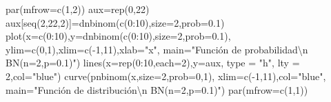 \documentclass[
  letterpaper,
  DIV=11,
  numbers=noendperiod]{scrreprt}
\newenvironment{Shaded}{\begin{snugshade}}{\end{snugshade}}
\newcommand{\AttributeTok}[1]{\textcolor[rgb]{0.40,0.45,0.13}{#1}}
\newcommand{\DecValTok}[1]{\textcolor[rgb]{0.68,0.00,0.00}{#1}}
\newcommand{\FloatTok}[1]{\textcolor[rgb]{0.68,0.00,0.00}{#1}}
\newcommand{\FunctionTok}[1]{\textcolor[rgb]{0.28,0.35,0.67}{#1}}
\newcommand{\NormalTok}[1]{\textcolor[rgb]{0.00,0.23,0.31}{#1}}
\newcommand{\OtherTok}[1]{\textcolor[rgb]{0.00,0.23,0.31}{#1}}
\newcommand{\SpecialCharTok}[1]{\textcolor[rgb]{0.37,0.37,0.37}{#1}}
\newcommand{\StringTok}[1]{\textcolor[rgb]{0.13,0.47,0.30}{#1}}
\begin{document}
\begin{Shaded}
\begin{Highlighting}[]
\FunctionTok{par}\NormalTok{(}\AttributeTok{mfrow=}\FunctionTok{c}\NormalTok{(}\DecValTok{1}\NormalTok{,}\DecValTok{2}\NormalTok{))}
\NormalTok{aux}\OtherTok{=}\FunctionTok{rep}\NormalTok{(}\DecValTok{0}\NormalTok{,}\DecValTok{22}\NormalTok{)}
\NormalTok{aux[}\FunctionTok{seq}\NormalTok{(}\DecValTok{2}\NormalTok{,}\DecValTok{22}\NormalTok{,}\DecValTok{2}\NormalTok{)]}\OtherTok{=}\FunctionTok{dnbinom}\NormalTok{(}\FunctionTok{c}\NormalTok{(}\DecValTok{0}\SpecialCharTok{:}\DecValTok{10}\NormalTok{),}\AttributeTok{size=}\DecValTok{2}\NormalTok{,}\AttributeTok{prob=}\FloatTok{0.1}\NormalTok{)}
\FunctionTok{plot}\NormalTok{(}\AttributeTok{x=}\FunctionTok{c}\NormalTok{(}\DecValTok{0}\SpecialCharTok{:}\DecValTok{10}\NormalTok{),}\AttributeTok{y=}\FunctionTok{dnbinom}\NormalTok{(}\FunctionTok{c}\NormalTok{(}\DecValTok{0}\SpecialCharTok{:}\DecValTok{10}\NormalTok{),}\AttributeTok{size=}\DecValTok{2}\NormalTok{,}\AttributeTok{prob=}\FloatTok{0.1}\NormalTok{),}
  \AttributeTok{ylim=}\FunctionTok{c}\NormalTok{(}\DecValTok{0}\NormalTok{,}\DecValTok{1}\NormalTok{),}\AttributeTok{xlim=}\FunctionTok{c}\NormalTok{(}\SpecialCharTok{{-}}\DecValTok{1}\NormalTok{,}\DecValTok{11}\NormalTok{),}\AttributeTok{xlab=}\StringTok{"x"}\NormalTok{,}
  \AttributeTok{main=}\StringTok{"Función de probabilidad}\SpecialCharTok{\textbackslash{}n}\StringTok{ BN(n=2,p=0.1)"}\NormalTok{)}
\FunctionTok{lines}\NormalTok{(}\AttributeTok{x=}\FunctionTok{rep}\NormalTok{(}\DecValTok{0}\SpecialCharTok{:}\DecValTok{10}\NormalTok{,}\AttributeTok{each=}\DecValTok{2}\NormalTok{),}\AttributeTok{y=}\NormalTok{aux, }\AttributeTok{type =} \StringTok{"h"}\NormalTok{, }\AttributeTok{lty =} \DecValTok{2}\NormalTok{,}\AttributeTok{col=}\StringTok{"blue"}\NormalTok{)}
\FunctionTok{curve}\NormalTok{(}\FunctionTok{pnbinom}\NormalTok{(x,}\AttributeTok{size=}\DecValTok{2}\NormalTok{,}\AttributeTok{prob=}\DecValTok{0}\NormalTok{,}\DecValTok{1}\NormalTok{),}
  \AttributeTok{xlim=}\FunctionTok{c}\NormalTok{(}\SpecialCharTok{{-}}\DecValTok{1}\NormalTok{,}\DecValTok{11}\NormalTok{),}\AttributeTok{col=}\StringTok{"blue"}\NormalTok{,}
  \AttributeTok{main=}\StringTok{"Función de distribución}\SpecialCharTok{\textbackslash{}n}\StringTok{ BN(n=2,p=0.1)"}\NormalTok{)}
\FunctionTok{par}\NormalTok{(}\AttributeTok{mfrow=}\FunctionTok{c}\NormalTok{(}\DecValTok{1}\NormalTok{,}\DecValTok{1}\NormalTok{))}
\end{Highlighting}
\end{Shaded}
\end{document}
